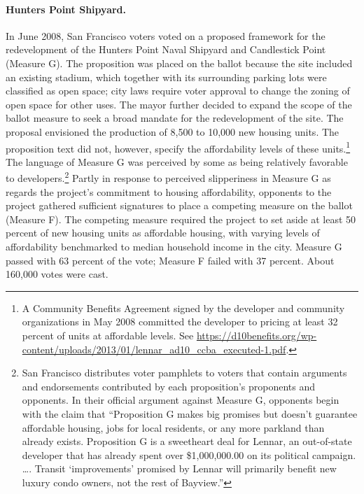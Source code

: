 \documentclass[article,11pt]{memoir}
\begin{document}
\paragraph{Hunters Point Shipyard.} In June 2008, San Francisco voters voted on a proposed framework for the redevelopment of the Hunters Point Naval Shipyard and Candlestick Point (Measure G). The proposition was placed on the ballot because the site included an existing stadium, which together with its surrounding parking lots were classified as open space; city laws require voter approval to change the zoning of open space for other uses. The mayor further decided to expand the scope of the ballot measure to seek a broad mandate for the redevelopment of the site. The proposal envisioned the production of 8,500 to 10,000 new housing units. The proposition text did not, however, specify the affordability levels of these units.\footnote{A Community Benefits Agreement signed by the developer and community organizations in May 2008 committed the developer to pricing at least 32 percent of units at affordable levels. See \url{https://d10benefits.org/wp-content/uploads/2013/01/lennar_ad10_ccba_executed-1.pdf}.} The language of Measure G was perceived by some as being relatively favorable to developers.\footnote{San Francisco distributes voter pamphlets to voters that contain arguments and endorsements contributed by each proposition's proponents and opponents. In their official argument against Measure G, opponents begin with the claim that ``Proposition G makes big promises but doesn't guarantee affordable housing, jobs for local residents, or any more parkland than already exists. Proposition G is a sweetheart deal for Lennar, an out-of-state developer that has already spent over \$1,000,000.00 on its political campaign. \ldots{}. Transit `improvements' promised by Lennar will primarily benefit new luxury condo owners, not the rest of Bayview.''}  Partly in response to perceived slipperiness in Measure G as regards the project's commitment to housing affordability, opponents to the project gathered sufficient signatures to place a competing measure on the ballot (Measure F). The competing measure required the project to set aside at least 50 percent of new housing units as affordable housing, with varying levels of affordability benchmarked to median household income in the city. Measure G passed with 63 percent of the vote; Measure F failed with 37 percent. About 160,000 votes were cast.
\end{document}
